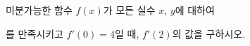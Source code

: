 미분가능한 함수 $f(x)$가 모든 실수 $x$, $y$에 대하여\par\smallskip{}\par\smallskip\noindent 를 만족시키고 $f'(0)=4$일 때, $f'(2)$의 값을 구하시오.
